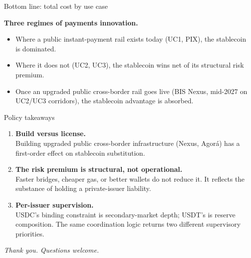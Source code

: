 \documentclass[aspectratio=169,11pt]{beamer}
\begin{document}
\begin{frame}{Bottom line: total cost by use case}
\centering
\renewcommand{\arraystretch}{1.3}
\footnotesize
{}

\bigskip

\textbf{Three regimes of payments innovation.}
\begin{itemize}\small\itemsep1pt
  \item Where a public instant-payment rail exists today (UC1, PIX), the stablecoin is dominated.
  \item Where it does not (UC2, UC3), the stablecoin wins net of its structural risk premium.
  \item Once an upgraded public cross-border rail goes live (BIS Nexus, mid-2027 on UC2/UC3 corridors), the stablecoin advantage is absorbed.
\end{itemize}
\end{frame}

\begin{frame}{Policy takeaways}
\begin{enumerate}
  \item \textbf{Build versus license.}\\
  Building upgraded public cross-border infrastructure (Nexus, Agorá) has a first-order effect on stablecoin substitution.

  \medskip
  \item \textbf{The risk premium is structural, not operational.}\\
  Faster bridges, cheaper gas, or better wallets do not reduce it. It reflects the substance of holding a private-issuer liability.

  \medskip
  \item \textbf{Per-issuer supervision.}\\
  USDC's binding constraint is secondary-market depth; USDT's is reserve composition. The same coordination logic returns two different supervisory priorities.
\end{enumerate}

\vfill
\centering
\small\emph{Thank you. Questions welcome.}
\end{frame}
\end{document}
